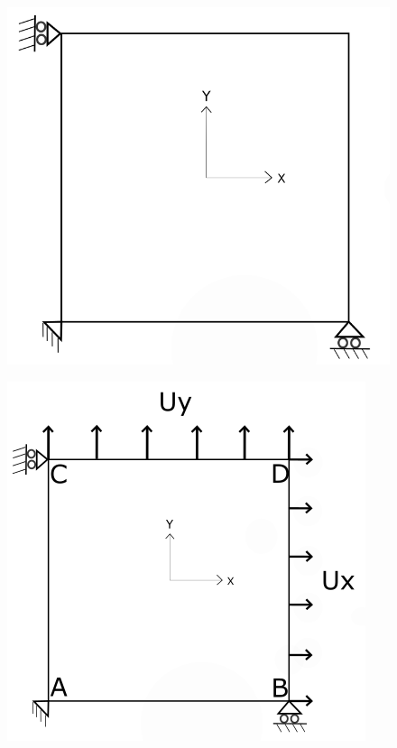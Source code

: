 \documentclass[11pt]{article}
\begin{document}
\begin{figure}[H]
	\centering
	\begin{minipage}{.5\textwidth}
		\centering
		\includegraphics[width=0.8\linewidth]{2DPlate.png}
		\label{2Dplate}
	\end{minipage}%
	\begin{minipage}{.5\textwidth}
		\centering
		\includegraphics[width=0.9\linewidth]{TimeitLoading.png}
		\label{TimeitLoading}
	\end{minipage}
\end{figure}
\end{document}
